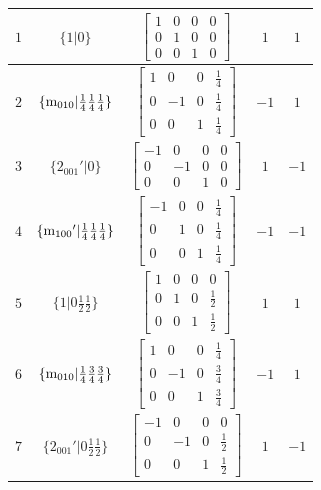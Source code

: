 \documentclass[fleqn,8pt]{jsarticle}
\begin{document}
\begin{longtable}{ccccc}
$ 1 $ & $ \{1|0\} $ & $ \begin{bmatrix} 1 & 0 & 0 & 0 \\ 0 & 1 & 0 & 0 \\ 0 & 0 & 1 & 0 \end{bmatrix} $ & $ 1 $ & $ 1 $ \\ \hline
$ 2 $ & $ \{{\rm m}_{010}|\frac{1}{4} \frac{1}{4} \frac{1}{4}\} $ & $ \begin{bmatrix} 1 & 0 & 0 & \frac{1}{4} \\ 0 & -1 & 0 & \frac{1}{4} \\ 0 & 0 & 1 & \frac{1}{4} \end{bmatrix} $ & $ -1 $ & $ 1 $ \\ \hline
$ 3 $ & $ \{2{}_{001}{}'|0\} $ & $ \begin{bmatrix} -1 & 0 & 0 & 0 \\ 0 & -1 & 0 & 0 \\ 0 & 0 & 1 & 0 \end{bmatrix} $ & $ 1 $ & $ -1 $ \\ \hline
$ 4 $ & $ \{{\rm m}_{100}{}'|\frac{1}{4} \frac{1}{4} \frac{1}{4}\} $ & $ \begin{bmatrix} -1 & 0 & 0 & \frac{1}{4} \\ 0 & 1 & 0 & \frac{1}{4} \\ 0 & 0 & 1 & \frac{1}{4} \end{bmatrix} $ & $ -1 $ & $ -1 $ \\ \hline
$ 5 $ & $ \{1|0 \frac{1}{2} \frac{1}{2}\} $ & $ \begin{bmatrix} 1 & 0 & 0 & 0 \\ 0 & 1 & 0 & \frac{1}{2} \\ 0 & 0 & 1 & \frac{1}{2} \end{bmatrix} $ & $ 1 $ & $ 1 $ \\ \hline
$ 6 $ & $ \{{\rm m}_{010}|\frac{1}{4} \frac{3}{4} \frac{3}{4}\} $ & $ \begin{bmatrix} 1 & 0 & 0 & \frac{1}{4} \\ 0 & -1 & 0 & \frac{3}{4} \\ 0 & 0 & 1 & \frac{3}{4} \end{bmatrix} $ & $ -1 $ & $ 1 $ \\ \hline
$ 7 $ & $ \{2{}_{001}{}'|0 \frac{1}{2} \frac{1}{2}\} $ & $ \begin{bmatrix} -1 & 0 & 0 & 0 \\ 0 & -1 & 0 & \frac{1}{2} \\ 0 & 0 & 1 & \frac{1}{2} \end{bmatrix} $ & $ 1 $ & $ -1 $ \\ \hline

\end{longtable}
\end{document}
